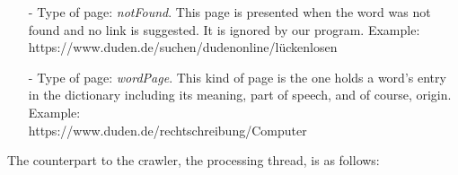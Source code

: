 \documentclass{article}
\begin{document}
\begin{itemize}
\begin{itemize}
		\item[-] Type of page: \textit{notFound}. This page is presented when the word was not found and no link is suggested. It is ignored by our program. Example: \\https://www.duden.de/suchen/dudenonline/lückenlosen
		\item[-] Type of page: \textit{wordPage}. This kind of page is the one holds a word's entry in the dictionary including its meaning, part of speech, and of course, origin. Example: \\https://www.duden.de/rechtschreibung/Computer
	\end{itemize}
\end{itemize}













The counterpart to the crawler, the processing thread, is as follows:
\end{document}
